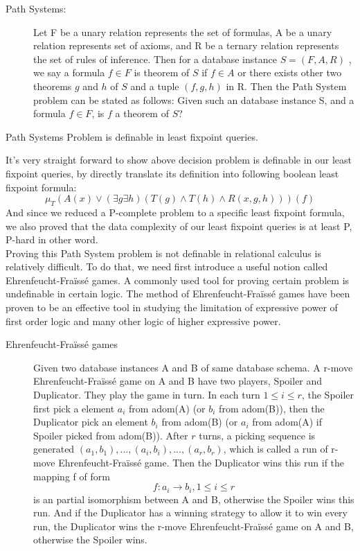 \begin{description}
\item[Path Systems:]
Let F be a unary relation represents the set of formulas, A be a unary relation represents set of axioms, and R be a ternary relation represents the set of rules of inference. Then for a database instance $S = (F, A, R) $ , we say a formula $f\in F$ is theorem of $S$ if $f\in A$ or there exists other two theorems $g$ and $h $ of $S$ and a tuple $(f, g, h)$ in R. Then the Path System problem can be stated as follows: Given such an database instance S, and a formula $f\in F$, is $f$ a theorem of $S$?\\
\end{description}

\begin{claim}
Path Systems Problem is definable in least fixpoint queries.
\end{claim}

It's very straight forward to show above decision problem is definable in our least fixpoint queries, by directly translate its definition into following boolean least fixpoint formula:
$$ \mu_T(A(x)\lor (\exists g \exists h)(T(g)\land T(h) \land R(x, g, h)))(f) $$
And since we reduced a P-complete problem to a specific least fixpoint formula, we also proved that the data complexity of our least fixpoint queries is at least P, P-hard in other word.\\

Proving this Path System problem is not definable in relational calculus is relatively difficult. To do that, we need first introduce a useful notion called Ehrenfeucht-Fra\"iss\'e games. A commonly used tool for proving certain problem is undefinable in certain logic. The method of Ehrenfeucht-Fra\"iss\'e games have been proven to be an effective tool in studying the limitation of expressive power of first order logic and many other logic of higher expressive power.

\begin{description}
\item[Ehrenfeucht-Fra\"iss\'e games]
Given two database instances A and B of same database schema. A r-move Ehrenfeucht-Fra\"iss\'e game on A and B have two players, Spoiler and Duplicator. They play the game in turn. In each turn $1\leq i \leq r$, the Spoiler first pick a element $a_i$ from adom(A) (or $b_i$ from adom(B)), then the Duplicator pick an element $b_i$ from adom(B) (or $a_i$ from adom(A) if Spoiler picked from adom(B)). After $r$ turns, a picking sequence is generated $(a_1, b_1),...,(a_i,b_i),...,(a_r, b_r)$, which is called a run of r-move Ehrenfeucht-Fra\"iss\'e game. Then the Duplicator wins this run if the mapping f of form
$$ f: a_i\rightarrow b_i, 1\leq i \leq r$$
is an partial isomorphism between A and B, otherwise the Spoiler wins this run. And if the Duplicator has a winning strategy to allow it to win every run, the Duplicator wins the r-move Ehrenfeucht-Fra\"iss\'e game on A and B, otherwise the Spoiler wins.
\end{description}

